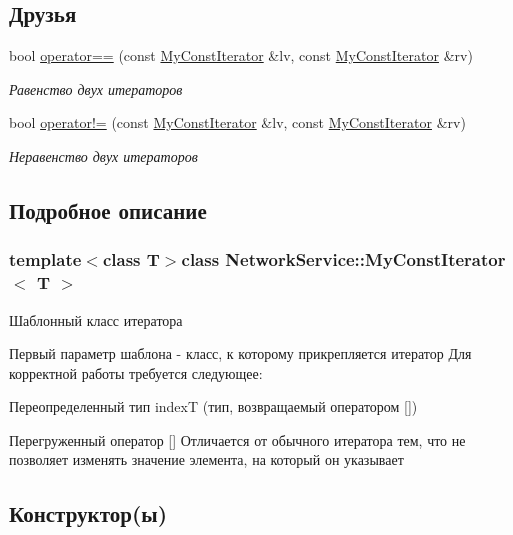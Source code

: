 \subsection*{Друзья}
\begin{DoxyCompactItemize}
\item 
bool \hyperlink{class_network_service_1_1_my_const_iterator_ac56e784eab6a4e2ec2009df237d19f4e}{operator==} (const \hyperlink{class_network_service_1_1_my_const_iterator}{My\+Const\+Iterator} \&lv, const \hyperlink{class_network_service_1_1_my_const_iterator}{My\+Const\+Iterator} \&rv)
\begin{DoxyCompactList}\small\item\em Равенство двух итераторов \end{DoxyCompactList}\item 
bool \hyperlink{class_network_service_1_1_my_const_iterator_a133b066e84ae10176ec5a109ce55f0e0}{operator!=} (const \hyperlink{class_network_service_1_1_my_const_iterator}{My\+Const\+Iterator} \&lv, const \hyperlink{class_network_service_1_1_my_const_iterator}{My\+Const\+Iterator} \&rv)
\begin{DoxyCompactList}\small\item\em Неравенство двух итераторов \end{DoxyCompactList}\end{DoxyCompactItemize}


\subsection{Подробное описание}
\subsubsection*{template$<$class T$>$class Network\+Service\+::\+My\+Const\+Iterator$<$ T $>$}

Шаблонный класс итератора 

Первый параметр шаблона -\/ класс, к которому прикрепляется итератор Для корректной работы требуется следующее\+:
\begin{DoxyItemize}
\item Переопределенный тип index\+T (тип, возвращаемый оператором \mbox{[}\mbox{]})
\item Перегруженный оператор \mbox{[}\mbox{]} Отличается от обычного итератора тем, что не позволяет изменять значение элемента, на который он указывает 
\end{DoxyItemize}

\subsection{Конструктор(ы)}
\hypertarget{class_network_service_1_1_my_const_iterator_ab1acfcd83f296465c285a336e8fb6e69}{}
